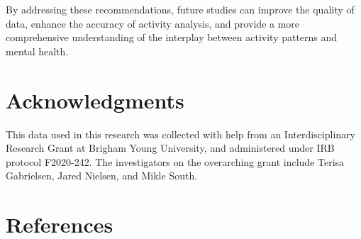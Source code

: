 \documentclass[
  letterpaper,
  number,
  review,
  3p]{elsarticle}
\begin{document}
By addressing these recommendations, future studies can improve the
quality of data, enhance the accuracy of activity analysis, and provide
a more comprehensive understanding of the interplay between activity
patterns and mental health.


\section*{Acknowledgments}\label{acknowledgments}


This data used in this research was collected with help from an
Interdisciplinary Research Grant at Brigham Young University, and
administered under IRB protocol F2020-242. The investigators on the
overarching grant include Terisa Gabrielsen, Jared Nielsen, and Mikle
South.


\section*{References}\label{references}

\end{document}
